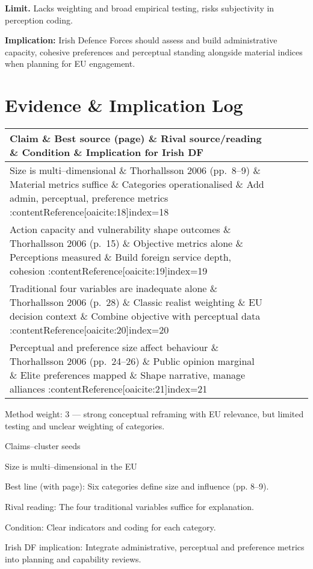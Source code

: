 \textbf{Limit.} Lacks weighting and broad empirical testing, risks subjectivity in perception coding.

\textbf{Implication:} Irish Defence Forces should assess and build administrative capacity, cohesive preferences and perceptual standing alongside material indices when planning for EU engagement.

\section*{Evidence \& Implication Log}
\begin{tabular}{p{3.2cm}p{4.2cm}p{3.6cm}p{3.2cm}p{4.2cm}}
	\textbf{Claim} \& \textbf{Best source (page)} \& \textbf{Rival source/reading} \& \textbf{Condition} \& \textbf{Implication for Irish DF}\\\hline
	Size is multi–dimensional \& Thorhallsson 2006 (pp.~8--9) \& Material metrics suffice \& Categories operationalised \& Add admin, perceptual, preference metrics :contentReference[oaicite:18]{index=18}\\
	Action capacity and vulnerability shape outcomes \& Thorhallsson 2006 (p.~15) \& Objective metrics alone \& Perceptions measured \& Build foreign service depth, cohesion :contentReference[oaicite:19]{index=19}\\
	Traditional four variables are inadequate alone \& Thorhallsson 2006 (p.~28) \& Classic realist weighting \& EU decision context \& Combine objective with perceptual data :contentReference[oaicite:20]{index=20}\\
	Perceptual and preference size affect behaviour \& Thorhallsson 2006 (pp.~24--26) \& Public opinion marginal \& Elite preferences mapped \& Shape narrative, manage alliances :contentReference[oaicite:21]{index=21}\\
\end{tabular}

Method weight: 3 — strong conceptual reframing with EU relevance, but limited testing and unclear weighting of categories.

Claims–cluster seeds

Size is multi–dimensional in the EU

Best line (with page): Six categories define size and influence (pp. 8–9).

Rival reading: The four traditional variables suffice for explanation.

Condition: Clear indicators and coding for each category.

Irish DF implication: Integrate administrative, perceptual and preference metrics into planning and capability reviews.

